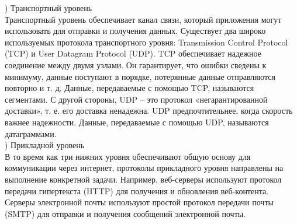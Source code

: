 ) Транспортный уровень \\
Транспортный уровень обеспечивает канал связи, который приложения могут использовать для отправки и получения данных. Существует два широко используемых протокола транспортного уровня: Transmission Control Protocol (TCP) и User Datagram Protocol (UDP). TCP обеспечивает надежное соединение между двумя узлами. Он гарантирует, что ошибки сведены к минимуму, данные поступают в порядке, потерянные данные отправляются повторно и т. д. Данные, передаваемые с помощью TCP, называются сегментами. С другой стороны, UDP – это протокол «негарантированной доставки», т. е. его доставка ненадежна. UDP предпочтительнее, когда скорость важнее надежности. Данные, передаваемые с помощью UDP, называются датаграммами. \\

) Прикладной уровень \\
В то время как три нижних уровня обеспечивают общую основу для коммуникации через интернет, протоколы прикладного уровня направлены на выполнение конкретной задачи. Например, веб-серверы используют протокол передачи гипертекста (HTTP) для получения и обновления веб-контента. Серверы электронной почты используют простой протокол передачи почты (SMTP) для отправки и получения сообщений электронной почты.
